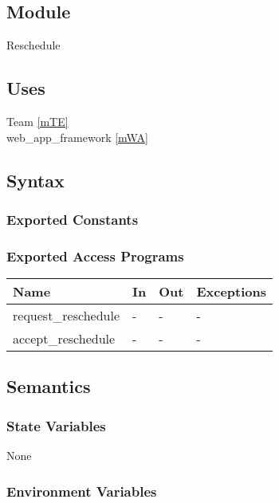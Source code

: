 \documentclass[12pt, titlepage]{article}
\begin{document}

\subsection{Module}

Reschedule

\subsection{Uses}

Team \ref{mTE} \\
web\_app\_framework \ref{mWA}

\subsection{Syntax}

\subsubsection{Exported Constants}

\subsubsection{Exported Access Programs}

\begin{center}
\begin{tabular}{p{5cm} p{4cm} p{4cm} p{2cm}}
\hline
\textbf{Name} & \textbf{In} & \textbf{Out} & \textbf{Exceptions} \\
\hline
request\_reschedule & - & - & - \\
accept\_reschedule & - & - & - \\
\hline
\end{tabular}
\end{center}

\subsection{Semantics}

\subsubsection{State Variables}

None

\subsubsection{Environment Variables}
\end{document}
